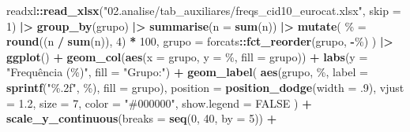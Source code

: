 \documentclass[
]{article}
\newenvironment{Shaded}{\begin{snugshade}}{\end{snugshade}}
\newcommand{\AttributeTok}[1]{\textcolor[rgb]{0.13,0.29,0.53}{#1}}
\newcommand{\ConstantTok}[1]{\textcolor[rgb]{0.56,0.35,0.01}{#1}}
\newcommand{\DecValTok}[1]{\textcolor[rgb]{0.00,0.00,0.81}{#1}}
\newcommand{\FloatTok}[1]{\textcolor[rgb]{0.00,0.00,0.81}{#1}}
\newcommand{\FunctionTok}[1]{\textcolor[rgb]{0.13,0.29,0.53}{\textbf{#1}}}
\newcommand{\NormalTok}[1]{#1}
\newcommand{\OtherTok}[1]{\textcolor[rgb]{0.56,0.35,0.01}{#1}}
\newcommand{\SpecialCharTok}[1]{\textcolor[rgb]{0.81,0.36,0.00}{\textbf{#1}}}
\newcommand{\StringTok}[1]{\textcolor[rgb]{0.31,0.60,0.02}{#1}}
\begin{document}
\begin{Shaded}
\begin{Highlighting}[]
\NormalTok{readxl}\SpecialCharTok{::}\FunctionTok{read\_xlsx}\NormalTok{(}\StringTok{"02.analise/tab\_auxiliares/freqs\_cid10\_eurocat.xlsx"}\NormalTok{, }\AttributeTok{skip =} \DecValTok{1}\NormalTok{) }\SpecialCharTok{|\textgreater{}} 
  \FunctionTok{group\_by}\NormalTok{(grupo) }\SpecialCharTok{|\textgreater{}} 
  \FunctionTok{summarise}\NormalTok{(}\AttributeTok{n =} \FunctionTok{sum}\NormalTok{(n)) }\SpecialCharTok{|\textgreater{}}
  \FunctionTok{mutate}\NormalTok{(}
    \StringTok{\textasciigrave{}}\AttributeTok{\%}\StringTok{\textasciigrave{}} \OtherTok{=} \FunctionTok{round}\NormalTok{((n }\SpecialCharTok{/} \FunctionTok{sum}\NormalTok{(n)), }\DecValTok{4}\NormalTok{) }\SpecialCharTok{*} \DecValTok{100}\NormalTok{,}
    \AttributeTok{grupo =}\NormalTok{ forcats}\SpecialCharTok{::}\FunctionTok{fct\_reorder}\NormalTok{(grupo, }\SpecialCharTok{{-}}\StringTok{\textasciigrave{}}\AttributeTok{\%}\StringTok{\textasciigrave{}}\NormalTok{)}
\NormalTok{  ) }\SpecialCharTok{|\textgreater{}} 
  \FunctionTok{ggplot}\NormalTok{() }\SpecialCharTok{+}
    \FunctionTok{geom\_col}\NormalTok{(}\FunctionTok{aes}\NormalTok{(}\AttributeTok{x =}\NormalTok{ grupo, }\AttributeTok{y =} \StringTok{\textasciigrave{}}\AttributeTok{\%}\StringTok{\textasciigrave{}}\NormalTok{, }\AttributeTok{fill =}\NormalTok{ grupo)) }\SpecialCharTok{+} 
    \FunctionTok{labs}\NormalTok{(}\AttributeTok{y =} \StringTok{"Frequência (\%)"}\NormalTok{, }\AttributeTok{fill =} \StringTok{"Grupo:"}\NormalTok{) }\SpecialCharTok{+} 
    \FunctionTok{geom\_label}\NormalTok{(}
      \FunctionTok{aes}\NormalTok{(grupo, }\StringTok{\textasciigrave{}}\AttributeTok{\%}\StringTok{\textasciigrave{}}\NormalTok{, }\AttributeTok{label =} \FunctionTok{sprintf}\NormalTok{(}\StringTok{"\%.2f"}\NormalTok{, }\StringTok{\textasciigrave{}}\AttributeTok{\%}\StringTok{\textasciigrave{}}\NormalTok{), }\AttributeTok{fill =}\NormalTok{ grupo), }
      \AttributeTok{position =} \FunctionTok{position\_dodge}\NormalTok{(}\AttributeTok{width =}\NormalTok{ .}\DecValTok{9}\NormalTok{), }\AttributeTok{vjust =} \FloatTok{1.2}\NormalTok{, }\AttributeTok{size =} \DecValTok{7}\NormalTok{, }\AttributeTok{color =} \StringTok{"\#000000"}\NormalTok{, }
      \AttributeTok{show.legend =} \ConstantTok{FALSE}
\NormalTok{    ) }\SpecialCharTok{+}
    \FunctionTok{scale\_y\_continuous}\NormalTok{(}\AttributeTok{breaks =} \FunctionTok{seq}\NormalTok{(}\DecValTok{0}\NormalTok{, }\DecValTok{40}\NormalTok{, }\AttributeTok{by =} \DecValTok{5}\NormalTok{)) }\SpecialCharTok{+}

\end{Highlighting}
\end{Shaded}
\end{document}
